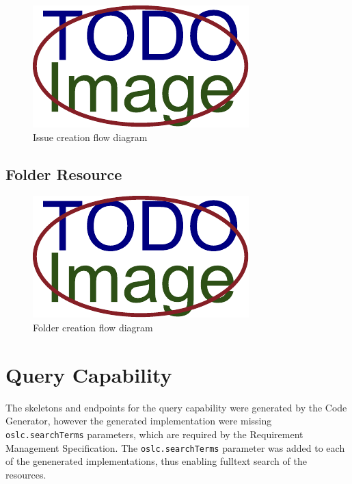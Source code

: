 
\begin{figure}[hbt]
  \centering
  \includegraphics[width=.8 \linewidth]{figures/placeholder.pdf}
  \caption{Issue creation flow diagram}
  \label{fig:issue_creation_flow}
\end{figure}

\subsection*{Folder Resource}


\begin{figure}[hbt]
  \centering
  \includegraphics[width=.8 \linewidth]{figures/placeholder.pdf}
  \caption{Folder creation flow diagram}
  \label{fig:folder_creation_flow}
\end{figure}


\section{Query Capability}
The skeletons and endpoints for the query capability were generated by the Code Generator, however the generated implementation were missing \texttt{oslc.searchTerms} parameters, which are required by the Requirement Management Specification. The \texttt{oslc.searchTerms} parameter was added to each of the genenerated implementations, thus enabling fulltext search of the resources. 

